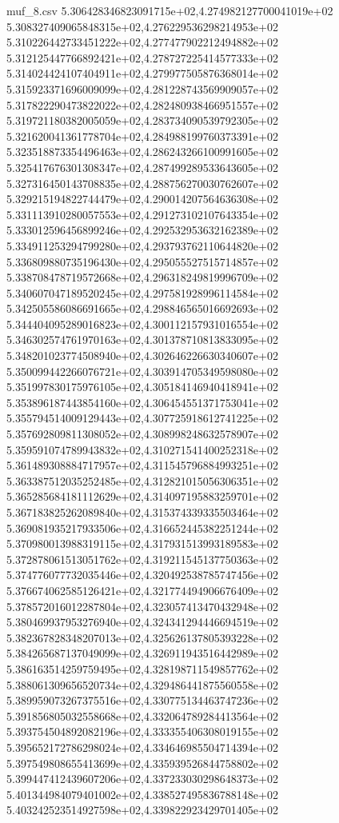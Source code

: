 \begin{filecontents*}{muf_8.csv}
5.306428346823091715e+02,4.274982127700041019e+02
5.308327409065848315e+02,4.276229536298214953e+02
5.310226442733451222e+02,4.277477902212494882e+02
5.312125447766892421e+02,4.278727225414577333e+02
5.314024424107404911e+02,4.279977505876368014e+02
5.315923371696009099e+02,4.281228743569909057e+02
5.317822290473822022e+02,4.282480938466951557e+02
5.319721180382005059e+02,4.283734090539792305e+02
5.321620041361778704e+02,4.284988199760373391e+02
5.323518873354496463e+02,4.286243266100991605e+02
5.325417676301308347e+02,4.287499289533643605e+02
5.327316450143708835e+02,4.288756270030762607e+02
5.329215194822744479e+02,4.290014207564636308e+02
5.331113910280057553e+02,4.291273102107643354e+02
5.333012596456899246e+02,4.292532953632162389e+02
5.334911253294799280e+02,4.293793762110644820e+02
5.336809880735196430e+02,4.295055527515714857e+02
5.338708478719572668e+02,4.296318249819996709e+02
5.340607047189520245e+02,4.297581928996114584e+02
5.342505586086691665e+02,4.298846565016692693e+02
5.344404095289016823e+02,4.300112157931016554e+02
5.346302574761970163e+02,4.301378710813833095e+02
5.348201023774508940e+02,4.302646226630340607e+02
5.350099442266076721e+02,4.303914705349598080e+02
5.351997830175976105e+02,4.305184146940418941e+02
5.353896187443854160e+02,4.306454551371753041e+02
5.355794514009129443e+02,4.307725918612741225e+02
5.357692809811308052e+02,4.308998248632578907e+02
5.359591074789943832e+02,4.310271541400252318e+02
5.361489308884717957e+02,4.311545796884993251e+02
5.363387512035252485e+02,4.312821015056306351e+02
5.365285684181112629e+02,4.314097195883259701e+02
5.367183825262089840e+02,4.315374339335503464e+02
5.369081935217933506e+02,4.316652445382251244e+02
5.370980013988319115e+02,4.317931513993189583e+02
5.372878061513051762e+02,4.319211545137750363e+02
5.374776077732035446e+02,4.320492538785747456e+02
5.376674062585126421e+02,4.321774494906676409e+02
5.378572016012287804e+02,4.323057413470432948e+02
5.380469937953276940e+02,4.324341294446694519e+02
5.382367828348207013e+02,4.325626137805393228e+02
5.384265687137049099e+02,4.326911943516442989e+02
5.386163514259759495e+02,4.328198711549857762e+02
5.388061309656520734e+02,4.329486441875560558e+02
5.389959073267375516e+02,4.330775134463747236e+02
5.391856805032558668e+02,4.332064789284413564e+02
5.393754504892082196e+02,4.333355406308019155e+02
5.395652172786298024e+02,4.334646985504714394e+02
5.397549808655413699e+02,4.335939526844758802e+02
5.399447412439607206e+02,4.337233030298648373e+02
5.401344984079401002e+02,4.338527495836788148e+02
5.403242523514927598e+02,4.339822923429701405e+02

\end{filecontents*}
